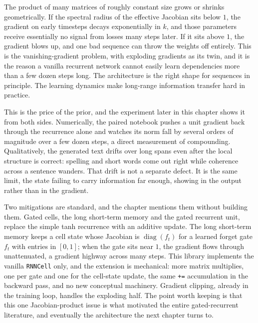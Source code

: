 The product of many matrices of roughly constant size grows or shrinks
geometrically. If the spectral radius of the effective Jacobian sits below
$1$, the gradient on early timesteps decays exponentially in $k$, and those
parameters receive essentially no signal from losses many steps later. If it
sits above $1$, the gradient blows up, and one bad sequence can throw the
weights off entirely. This is the vanishing-gradient problem, with exploding
gradients as its twin, and it is the reason a vanilla recurrent network
cannot easily learn dependencies more than a few dozen steps long. The
architecture is the right shape for sequences in principle. The learning
dynamics make long-range information transfer hard in practice.

This is the price of the prior, and the experiment later in this chapter
shows it from both sides. Numerically, the paired notebook pushes a unit
gradient back through the recurrence alone and watches its norm fall by
several orders of magnitude over a few dozen steps, a direct measurement of
 compounding. Qualitatively, the generated text drifts
over long spans even after the local structure is correct: spelling and
short words come out right while coherence across a sentence wanders. That
drift is not a separate defect. It is the same limit, the state failing to
carry information far enough, showing in the output rather than in the
gradient.

Two mitigations are standard, and the chapter mentions them without building
them. Gated cells, the long short-term memory and the gated recurrent unit,
replace the simple tanh recurrence with an additive update. The long
short-term memory keeps a cell state whose Jacobian is
$\operatorname{diag}(f_t)$ for a learned forget gate $f_t$ with entries in
$[0, 1]$; when the gate sits near $1$, the gradient flows through
unattenuated, a gradient highway across many steps. This library implements
the vanilla \texttt{RNNCell} only, and the extension is mechanical: more
matrix multiplies, one per gate and one for the cell-state update, the same
\texttt{+=} accumulation in the backward pass, and no new conceptual
machinery. Gradient clipping, already in the training loop, handles the
exploding half. The point worth keeping is that this one Jacobian-product
issue is what motivated the entire gated-recurrent literature, and
eventually the architecture the next chapter turns to.
